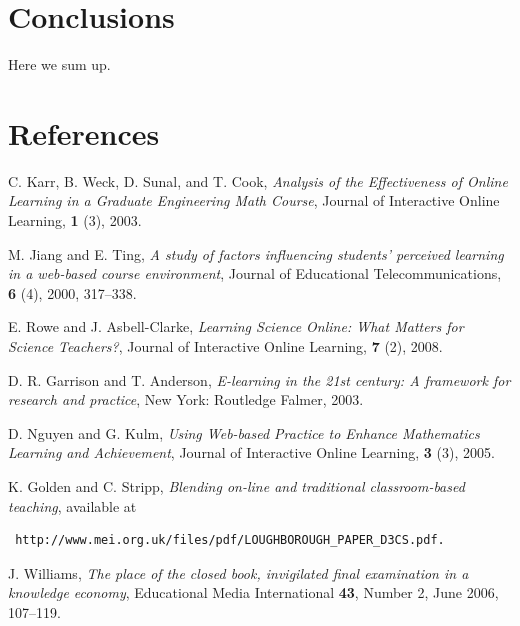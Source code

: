 \documentclass{amsart}
\begin{document}
\section{Conclusions}
Here we sum up.

\section{References}


\begin{thebibliography}{12345}


 C. Karr, B. Weck, D. Sunal, and T. Cook, \emph{Analysis of the Effectiveness of Online 	 Learning in a Graduate Engineering Math Course}, Journal of Interactive Online 	Learning, \textbf{1} (3), 2003.

 M. Jiang and E. Ting, \emph{A study of factors influencing students' perceived learning in a 	 web-based course environment}, Journal of Educational Telecommunications, \textbf{6} (4), 2000,	317--338.

 E. Rowe and J. Asbell-Clarke, \emph{Learning Science Online: What Matters for Science 	Teachers?}, Journal of Interactive Online Learning, \textbf{7} (2), 2008.

 D. R. Garrison and T. Anderson, \emph{E-learning in the 21st century: A framework for 	research and practice}, New York: Routledge Falmer, 2003.

 D. Nguyen and G. Kulm, \emph{Using Web-based Practice to Enhance Mathematics 	Learning and Achievement}, Journal of Interactive Online Learning, \textbf{3} (3), 2005.

 K. Golden and C. Stripp, \emph{Blending on-line and traditional classroom-based teaching}, available at \begin{verbatim} http://www.mei.org.uk/files/pdf/LOUGHBOROUGH_PAPER_D3CS.pdf. \end{verbatim}

 J. Williams, \emph{The place of the closed book, invigilated final examination in a knowledge economy}, Educational Media International \textbf{43}, Number 2, June 2006, 107--119.

\end{thebibliography}
\end{document}
